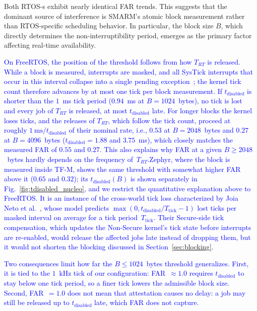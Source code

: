 \documentclass[journal]{IEEEtran}
\newcommand\ben[1]{\textcolor{blue}{#1}}
\begin{document}
Both RTOS-s exhibit nearly identical FAR trends.
This suggests that the dominant source of interference is SMARM’s atomic block measurement rather than RTOS-specific scheduling behavior.
In particular, the block size $B$, which directly determines the non-interruptibility period, emerges as the primary factor affecting real-time availability.
\ben{On FreeRTOS, the position of the threshold follows from how $T_{RT}$ is released.
While a block is measured, interrupts are masked, and all SysTick interrupts that occur in this interval collapse into a single pending exception~\cite{armv8m-arm}; the kernel tick count therefore advances by at most one tick per block measurement.
If $t_{\text{disabled}}$ is shorter than the $1$~ms tick period ($0.94$~ms at $B = 1024$~bytes), no tick is lost and every job of $T_{RT}$ is released, at most $t_{\text{disabled}}$ late.
For longer blocks the kernel loses ticks, and the releases of $T_{RT}$, which follow the tick count, proceed at roughly $1~\text{ms}/t_{\text{disabled}}$ of their nominal rate, i.e., $0.53$ at $B = 2048$~bytes and $0.27$ at $B = 4096$~bytes ($t_{\text{disabled}} = 1.88$ and $3.75$~ms), which closely matches the measured FAR of $0.55$ and $0.27$.
This also explains why FAR at a given $B \ge 2048$~bytes hardly depends on the frequency of~$T_{RT}$.Zephyr, where the block is measured inside TF-M, shows the same threshold with somewhat higher FAR above it ($0.65$ and $0.32$); its $t_{\text{disabled}}(B)$ is shown separately in Fig.~\ref{fig:tdisabled_nucleo}, and we restrict the quantitative explanation above to FreeRTOS.
It is an instance of the cross-world tick loss characterized by Joia Neto et al.~\cite{joianeto2026timekeeping}, whose model predicts $\max(0, t_{\text{disabled}}/T_{\text{tick}} - 1)$ lost ticks per masked interval on average for a tick period~$T_{\text{tick}}$.
Their Secure-side tick compensation, which updates the Non-Secure kernel's tick state before interrupts are re-enabled, would release the affected jobs late instead of dropping them, but it would not shorten the blocking discussed in Section~\ref{sec:blocking}.

Two consequences limit how far the $B \le 1024$~bytes threshold generalizes.
First, it is tied to the $1$~kHz tick of our configuration: FAR~$\approx 1.0$ requires $t_{\text{disabled}}$ to stay below one tick period, so a finer tick lowers the admissible block size.
Second, FAR~$= 1.0$ does not mean that attestation causes no delay: a job may still be released up to $t_{\text{disabled}}$ late, which FAR does not capture.}
\end{document}
